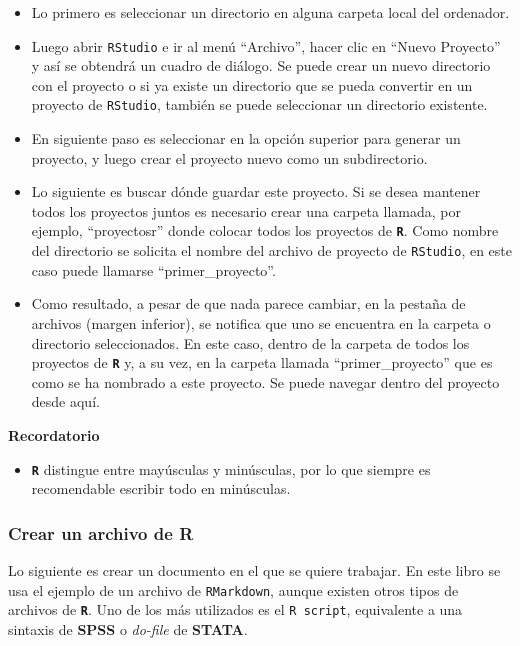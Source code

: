 \documentclass[
]{article}
\providecommand{\tightlist}{%
  \setlength{\itemsep}{0pt}\setlength{\parskip}{0pt}}
\begin{document}
\begin{itemize}
\item
  Lo primero es seleccionar un directorio en alguna carpeta local del ordenador.
\item
  Luego abrir \texttt{RStudio} e ir al menú ``Archivo'', hacer clic en ``Nuevo Proyecto'' y así se obtendrá un cuadro de diálogo. Se puede crear un nuevo directorio con el proyecto o si ya existe un directorio que se pueda convertir en un proyecto de \texttt{RStudio}, también se puede seleccionar un directorio existente.
\item
  En siguiente paso es seleccionar en la opción superior para generar un proyecto, y luego crear el proyecto nuevo como un subdirectorio.
\item
  Lo siguiente es buscar dónde guardar este proyecto. Si se desea mantener todos los proyectos juntos es necesario crear una carpeta llamada, por ejemplo, ``proyectosr'' donde colocar todos los proyectos de \textbf{\texttt{R}}. Como nombre del directorio se solicita el nombre del archivo de proyecto de \texttt{RStudio}, en este caso puede llamarse ``primer\_proyecto''.
\item
  Como resultado, a pesar de que nada parece cambiar, en la pestaña de archivos (margen inferior), se notifica que uno se encuentra en la carpeta o directorio seleccionados. En este caso, dentro de la carpeta de todos los proyectos de \textbf{\texttt{R}} y, a su vez, en la carpeta llamada ``primer\_proyecto'' que es como se ha nombrado a este proyecto. Se puede navegar dentro del proyecto desde aquí.
\end{itemize}

\textbf{Recordatorio}

\begin{itemize}
\tightlist
\item
  \textbf{\texttt{R}} distingue entre mayúsculas y minúsculas, por lo que siempre es recomendable escribir todo en minúsculas.
\end{itemize}

\hypertarget{crear-un-archivo-de-r}{%
\subsubsection{Crear un archivo de R}\label{crear-un-archivo-de-r}}

Lo siguiente es crear un documento en el que se quiere trabajar. En este libro se usa el ejemplo de un archivo de \texttt{RMarkdown}, aunque existen otros tipos de archivos de \textbf{\texttt{R}}. Uno de los más utilizados es el \texttt{R\ script}, equivalente a una sintaxis de \textbf{SPSS} o \emph{do-file} de \textbf{STATA}.
\end{document}
